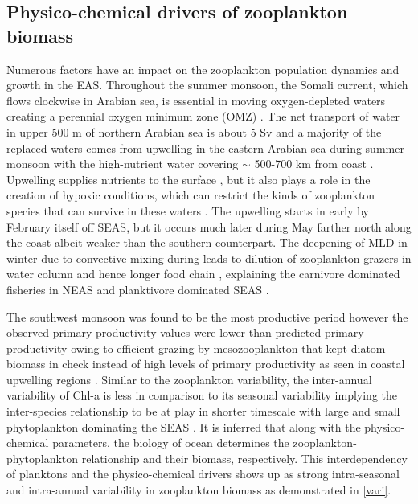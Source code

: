 \documentclass{article}
\begin{document}
	\subsection{Physico-chemical drivers of zooplankton biomass}
	Numerous factors have an impact on the zooplankton population dynamics and growth in the EAS. Throughout the summer monsoon, the Somali current, which flows clockwise in Arabian sea, is essential in moving oxygen-depleted waters creating a perennial oxygen minimum zone (OMZ) \citep{sarma2020potential,sudheesh2022omz}. The net transport of water in upper 500 m of northern Arabian sea is about 5 Sv and a majority of the replaced waters comes from upwelling in the eastern Arabian sea \citep{shi1999remotely} during summer monsoon with the high-nutrient water covering $\sim$ 500-700 km from coast \citep{morrison1998seasonal}. Upwelling supplies nutrients to the surface \citep{Kumar.2000}, but it also plays a role in the creation of hypoxic conditions, which can restrict the kinds of zooplankton species that can survive in these waters \citep{jayakumar.2004}. The upwelling starts in early by February itself off SEAS, but it occurs much later during May farther north along the coast \citep{banse1968hydrography,Kumar.2000,vijith2016consequences,sarma2020potential} albeit weaker than the southern counterpart. The deepening of MLD in winter due to convective mixing during \citep{marra2005jgofs, shankar2016inhibition,shi2022phytoplankton} leads to dilution of zooplankton grazers in water column \citep{marra2005jgofs} and hence longer food chain \citep{banse1995zooplankton,barber2001qn}, explaining the carnivore dominated fisheries in NEAS \citep{shankar2019role} and planktivore dominated SEAS \citep{longhurst1990gd,shankar2019role}. 
	
	The southwest monsoon was found to be the most productive period \citep{Kumar.2000} however the observed primary productivity values were lower than predicted primary productivity owing to efficient grazing by mesozooplankton that kept diatom biomass in check instead of high levels of primary productivity as seen in coastal upwelling regions \citep{barber2001qn}. Similar to the zooplankton variability, the inter-annual variability of Chl-a is less in comparison to its seasonal variability \citep{shi2022phytoplankton} implying the inter-species relationship to be at play in shorter timescale with large and small phytoplankton dominating the SEAS \citep{shankar2019role}. It is inferred that along with the physico-chemical parameters, the biology of ocean determines the zooplankton-phytoplankton relationship and their biomass, respectively. This interdependency of planktons and the physico-chemical drivers shows up as strong intra-seasonal and intra-annual variability in zooplankton biomass as demonstrated in \autoref{vari}. 
	
\end{document}
